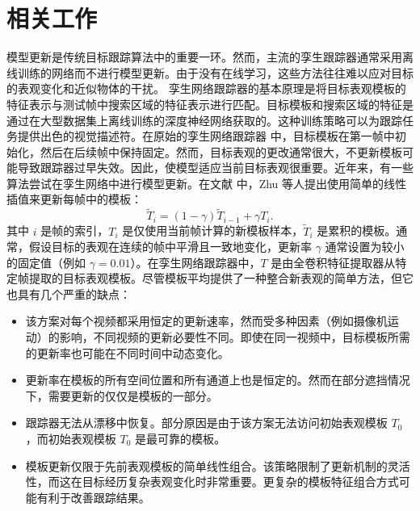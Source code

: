 \section{相关工作}
模型更新是传统目标跟踪算法中的重要一环。然而，主流的孪生跟踪器通常采用离线训练的网络而不进行模型更新。由于没有在线学习，这些方法往往难以应对目标的表观变化和近似物体的干扰。
孪生网络跟踪器的基本原理是将目标表观模板的特征表示与测试帧中搜索区域的特征表示进行匹配。目标模板和搜索区域的特征是通过在大型数据集上离线训练的深度神经网络获取的。这种训练策略可以为跟踪任务提供出色的视觉描述符。在原始的孪生网络跟踪器 \cite{SiamFC} 中，目标模板在第一帧中初始化，然后在后续帧中保持固定。然而，目标表观的更改通常很大，不更新模板可能导致跟踪器过早失效。因此，使模型适应当前目标表观很重要。近年来，有一些算法尝试在孪生网络中进行模型更新。在文献 \cite{zhu2018distractor} 中，Zhu 等人提出使用简单的线性插值来更新每帧中的模板：
\begin{equation}
\widetilde{T}_{i}=(1-\gamma) \widetilde{T}_{i-1}+\gamma T_{i}.
\end{equation}
其中 $i$ 是帧的索引，$T_{i}$ 是仅使用当前帧计算的新模板样本，$\widetilde{T}_{i}$ 是累积的模板。通常，假设目标的表观在连续的帧中平滑且一致地变化，更新率 $\gamma$ 通常设置为较小的固定值（例如 $\gamma = 0.01$）。在孪生网络跟踪器中，$T$ 是由全卷积特征提取器从特定帧提取的目标表观模板。尽管模板平均提供了一种整合新表观的简单方法，但它也具有几个严重的缺点：

\begin{itemize}
\item 该方案对每个视频都采用恒定的更新速率，然而受多种因素（例如摄像机运动）的影响，不同视频的更新必要性不同。即使在同一视频中，目标模板所需的更新率也可能在不同时间中动态变化。
\item 更新率在模板的所有空间位置和所有通道上也是恒定的。然而在部分遮挡情况下，需要更新的仅仅是模板的一部分。
\item 跟踪器无法从漂移中恢复。部分原因是由于该方案无法访问初始表观模板 $T_{0}$，而初始表观模板 $T_{0}$ 是最可靠的模板。
\item 模板更新仅限于先前表观模板的简单线性组合。该策略限制了更新机制的灵活性，而这在目标经历复杂表观变化时非常重要。更复杂的模板特征组合方式可能有利于改善跟踪结果。
\end{itemize}

